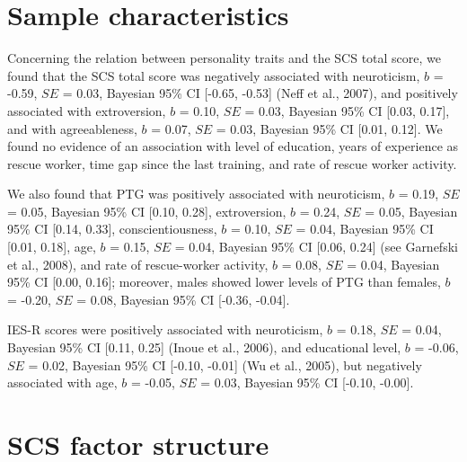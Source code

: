 \documentclass[
  english,
  man,floatsintext]{apa7}
\begin{document}
\newpage

\renewcommand{\appendixname}{Supplementary Information}
\setcounter{page}{1}


\clearpage
\makeatletter
\efloat@restorefloats
\makeatother


\begin{appendix}
\hypertarget{sample-characteristics}{%
\section{Sample characteristics}\label{sample-characteristics}}

Concerning the relation between personality traits and the SCS total
score, we found that the SCS total score was negatively associated with
neuroticism, \(b\) = -0.59, \(SE\) = 0.03, Bayesian 95\% CI {[}-0.65,
-0.53{]} (Neff et al., 2007), and positively associated with
extroversion, \(b\) = 0.10, \(SE\) = 0.03, Bayesian 95\% CI {[}0.03,
0.17{]}, and with agreeableness, \(b\) = 0.07, \(SE\) = 0.03, Bayesian
95\% CI {[}0.01, 0.12{]}. We found no evidence of an association with
level of education, years of experience as rescue worker, time gap since
the last training, and rate of rescue worker activity.

We also found that PTG was positively associated with neuroticism, \(b\)
= 0.19, \(SE\) = 0.05, Bayesian 95\% CI {[}0.10, 0.28{]}, extroversion,
\(b\) = 0.24, \(SE\) = 0.05, Bayesian 95\% CI {[}0.14, 0.33{]},
conscientiousness, \(b\) = 0.10, \(SE\) = 0.04, Bayesian 95\% CI
{[}0.01, 0.18{]}, age, \(b\) = 0.15, \(SE\) = 0.04, Bayesian 95\% CI
{[}0.06, 0.24{]} (see Garnefski et al., 2008), and rate of rescue-worker
activity, \(b\) = 0.08, \(SE\) = 0.04, Bayesian 95\% CI {[}0.00,
0.16{]}; moreover, males showed lower levels of PTG than females, \(b\)
= -0.20, \(SE\) = 0.08, Bayesian 95\% CI {[}-0.36, -0.04{]}.

IES-R scores were positively associated with neuroticism, \(b\) = 0.18,
\(SE\) = 0.04, Bayesian 95\% CI {[}0.11, 0.25{]} (Inoue et al., 2006),
and educational level, \(b\) = -0.06, \(SE\) = 0.02, Bayesian 95\% CI
{[}-0.10, -0.01{]} (Wu et al., 2005), but negatively associated with
age, \(b\) = -0.05, \(SE\) = 0.03, Bayesian 95\% CI {[}-0.10, -0.00{]}.

\newpage

\hypertarget{scs-factor-structure}{%
\section{SCS factor structure}\label{scs-factor-structure}}


\end{appendix}
\end{document}
